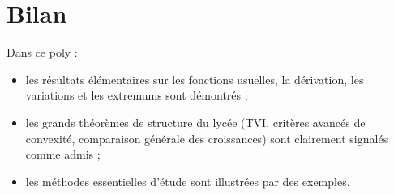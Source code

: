 \documentclass[11pt,a4paper]{article}
\begin{document}
\section*{Bilan}

Dans ce poly :
\begin{itemize}
    \item les résultats élémentaires sur les fonctions usuelles, la dérivation, les variations et les extremums sont démontrés ;
    \item les grands théorèmes de structure du lycée (TVI, critères avancés de convexité, comparaison générale des croissances) sont clairement signalés comme admis ;
    \item les méthodes essentielles d'étude sont illustrées par des exemples.
\end{itemize}
\end{document}

